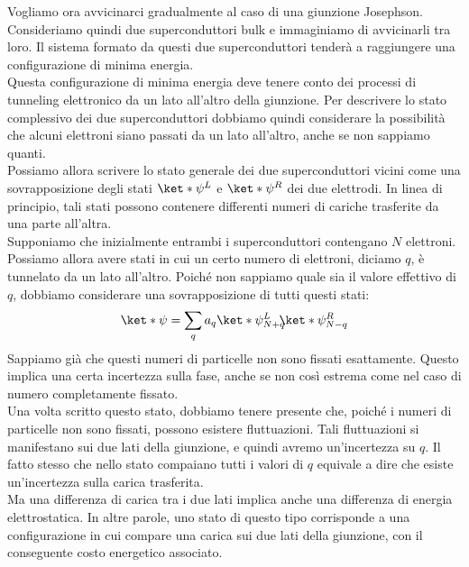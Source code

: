 Vogliamo ora avvicinarci gradualmente al caso di una giunzione Josephson. Consideriamo quindi due superconduttori bulk e immaginiamo di avvicinarli tra loro. Il sistema formato da questi due superconduttori tenderà a raggiungere una configurazione di minima energia.\\
Questa configurazione di minima energia deve tenere conto dei processi di tunneling elettronico da un lato all'altro della giunzione. Per descrivere lo stato complessivo dei due superconduttori dobbiamo quindi considerare la possibilità che alcuni elettroni siano passati da un lato all'altro, anche se non sappiamo quanti.\\
Possiamo allora scrivere lo stato generale dei due superconduttori vicini come una sovrapposizione degli stati $\ket*{\psi^L}$ e $\ket*{\psi^R}$ dei due elettrodi. In linea di principio, tali stati possono contenere differenti numeri di cariche trasferite da una parte all'altra.\\
Supponiamo che inizialmente entrambi i superconduttori contengano $N$ elettroni. Possiamo allora avere stati in cui un certo numero di elettroni, diciamo $q$, è tunnelato da un lato all'altro. Poiché non sappiamo quale sia il valore effettivo di $q$, dobbiamo considerare una sovrapposizione di tutti questi stati:
\begin{equation*}
    \ket*{\psi}
    =\sum_q a_q \ket*{\psi^L_{N+q}} \hspace{-0.17cm} \ket*{\psi^R_{N-q}}
\end{equation*}
Sappiamo già che questi numeri di particelle non sono fissati esattamente. Questo implica una certa incertezza sulla fase, anche se non così estrema come nel caso di numero completamente fissato.\\
Una volta scritto questo stato, dobbiamo tenere presente che, poiché i numeri di particelle non sono fissati, possono esistere fluttuazioni. Tali fluttuazioni si manifestano sui due lati della giunzione, e quindi avremo un'incertezza su $q$. Il fatto stesso che nello stato compaiano tutti i valori di $q$ equivale a dire che esiste un'incertezza sulla carica trasferita.\\
Ma una differenza di carica tra i due lati implica anche una differenza di energia elettrostatica. In altre parole, uno stato di questo tipo corrisponde a una configurazione in cui compare una carica sui due lati della giunzione, con il conseguente costo energetico associato.\\
